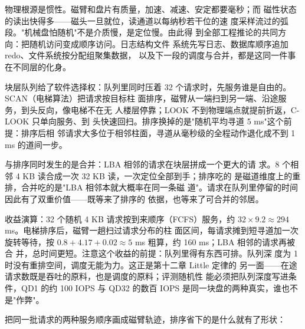 物理根源是惯性。磁臂和盘片有质量，加速、减速、安定都要毫秒；而
磁性状态的读出快得多——磁头一旦就位，读通道以每纳秒若干位的速
度采样流过的弧段。"机械盘怕随机"不是介质慢，是定位慢。由此得
到全部工程推论的共同方向：把随机访问变成顺序访问。日志结构文件
系统先写日志、数据库顺序追加 redo、文件系统按分配组聚集数据，
以及下一段的调度与合并，都是这同一件事在不同层的化身。

块层队列给了软件选择权：队列里同时压着
32 个请求时，先服务谁是自由的。SCAN（电梯算法）把请求按目标柱
面排序，磁臂从一端扫到另一端、沿途服务，到头反向，像电梯不在无
人楼层停靠；LOOK 不到物理端点就提前折返，C-LOOK 只单向服务、到
头快速回扫。排序换掉的是"随机平均寻道 5 ms"这个前提：排序后相
邻请求大多位于相邻柱面，寻道从毫秒级的全程动作退化成不到 1 ms
的道间一步。

与排序同时发生的是合并：LBA 相邻的请求在块层拼成一个更大的请
求。8 个相邻 4 KB 读合成一次 32 KB 读，一次定位全部到手；排序吃的
是磁道维度上的重排，合并吃的是"LBA 相邻本就大概率在同一条磁
道"。请求在队列里停留的时间因此有了双重价值——既等来了排序的
依据，也等来了可合并的邻居。

收益演算：32 个随机 4 KB 请求按到来顺序（FCFS）服务，约
$32\times9.2\approx294$ ms。电梯排序后，磁臂一趟扫过请求分布的柱
面区间，每请求摊到短寻道加一次旋转等待，按
$0.8+4.17+0.02\approx5$ ms 粗算，约 160 ms；LBA 相邻的请求再被合
并，总时间更短。注意这个收益的前提：队列里得有东西可排。队列深
度为 1 时没有重排空间，调度无能为力。这正是第十二章 Little 定律的
另一面——在途请求数既是吞吐的原料，也是调度的原料；评测随机性
能必须把队列深度写进条件，QD1 的约 100 IOPS 与 QD32 的数百 IOPS
是同一块盘的两种真实，谁也不是"作弊"。

把同一批请求的两种服务顺序画成磁臂轨迹，排序省下的是什么就有了形状：

